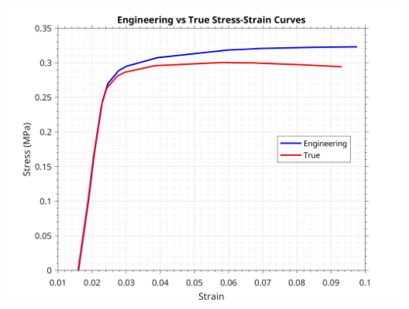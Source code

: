 \documentclass[a4paper, 12pt]{report}
\def\link{blue!50!black}
\begin{document}
    
    \vspace{1em}
    \includegraphics[width=1\textwidth]{images/stressvstran.png}
    \newpage
    
\end{document}

